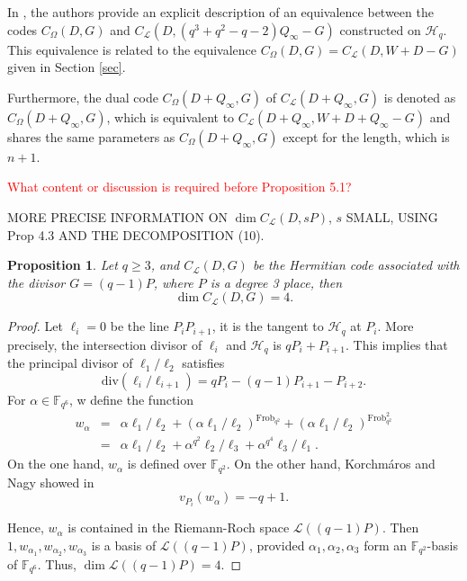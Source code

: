 \documentclass[a4paper]{amsart}
\theoremstyle{plain}
\newtheorem{proposition}[theorem]{Proposition}
\theoremstyle{definition}
\theoremstyle{remark}
\begin{document}
In \cite[Proposition 2.2]{korchmaros2013hermitian}, the authors provide an explicit description of an equivalence between the codes $C_{\Omega}(D,G)$ and $C_{\mathcal{L}}(D,(q^3+q^2-q-2)Q_{\infty}-G)$ constructed on $\mathscr{H}_q$. This equivalence is related to the equivalence $C_{\Omega}(D,G)= C_{\mathcal{L}}(D,W + D - G)$ given in Section \ref{sec}.

Furthermore, the dual code $C_{\Omega}(D+Q_{\infty},G)$ of $C_{\mathcal{L}}(D+Q_{\infty},G)$ is denoted as $C_{\Omega}(D+Q_{\infty},G)$, which is equivalent to $C_{\mathcal{L}}(D+Q_{\infty},W + D+ Q_{\infty} - G)$ and shares the same parameters as $C_{\Omega}(D+Q_{\infty},G)$ except for the length, which is $n+1$.

\textcolor{red}{What content or discussion is required before Proposition 5.1?}


MORE PRECISE INFORMATION ON $\dim C_{\mathcal{L}}(D,sP)$, $s$ SMALL, USING Prop 4.3 AND THE DECOMPOSITION (10).

\begin{proposition}
	
	Let $q\geq 3$, and $C_{\mathcal{L}}(D,G)$ be the Hermitian code associated with the divisor $G=(q-1)P$, where $P$ is a degree 3 place, then
	\[\dim C_{\mathcal{L}}(D,G)=4.\]
	
\end{proposition}

\begin{proof}
	
	Let $\ell_i=0$ be the line $P_iP_{i+1}$, it is the tangent to $\mathscr{H}_q$ at $P_i$. More precisely, the intersection divisor of $\ell_i$ and $\mathscr{H}_q$ is $qP_i+P_{i+1}$. This implies that the principal divisor of $\ell_1/\ell_2$ satisfies
	\[\mathrm{div}(\ell_i/\ell_{i+1})=qP_i-(q-1)P_{i+1}-P_{i+2}.\]
	For $\alpha \in \mathbb{F}_{q^6}$, w define the function
	\begin{eqnarray*}
		w_\alpha&=&\alpha\ell_1/\ell_2+(\alpha\ell_1/\ell_2)^{\mathrm{Frob}_{q^2}}+(\alpha\ell_1/\ell_2)^{\mathrm{Frob}_{q^2}^2}\\
		&=&\alpha\ell_1/\ell_2+\alpha^{q^2}\ell_2/\ell_3+\alpha^{q^4}\ell_3/\ell_1.
	\end{eqnarray*}
	On the one hand, $w_\alpha$ is defined over $\mathbb{F}_{q^2}$. On the other hand, Korchm\'aros and Nagy showed in \cite[Theorem ~3.1]{korchmaros2013hermitian}
	\[v_{P_i}(w_\alpha)=-q+1.\]
	
	Hence, $w_\alpha$ is contained in the Riemann-Roch space $\mathcal{L}((q-1)P)$. Then $1,w_{\alpha_1}, w_{\alpha_2}, w_{\alpha_3}$ is a basis of $\mathcal{L}((q-1)P)$, provided $\alpha_1,\alpha_2,\alpha_3$ form an $\mathbb{F}_{q^2}$-basis of $\mathbb{F}_{q^6}$. Thus, $\dim\mathcal{L}((q-1)P)=4$.
	
\end{proof}
\end{document}
